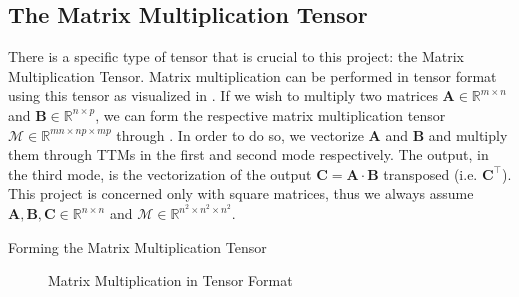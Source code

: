 \subsection{The Matrix Multiplication Tensor} \label{sec:The Matrix Multiplication Tensor}

    There is a specific type of tensor that is crucial to this project: the
    Matrix Multiplication Tensor. Matrix multiplication can be performed in
    tensor format using this tensor as visualized in .
    If we wish to multiply two matrices $\mathbf{A} \in \mathbb{R}^{m\times n}$
    and $\mathbf{B}\in \mathbb{R}^{n\times p}$, we can form the respective
    matrix multiplication tensor $\mathcal{M}\in \mathbb{R}^{mn \times np\times
    mp}$ through . In order to do so, we vectorize
    $\mathbf{A}$ and $\mathbf{B}$ and multiply them through TTMs in the first
    and second mode respectively. The output, in the third mode, is the
    vectorization of the output $\mathbf{C} = \mathbf{A}\cdot \mathbf{B}$
    transposed (i.e. $\mathbf{C^\intercal}$). This project is concerned only
    with square matrices, thus we always assume $\mathbf{A}, \mathbf{B},
    \mathbf{C}\in \mathbb{R}^{n\times n}$ and
    $\mathcal{M}\in\mathbb{R}^{n^2\times n^2\times n^2}$.

    \begin{algorithm}
        \caption{Forming the Matrix Multiplication Tensor}
        \label{alg:matmul_tensor}
        \begin{algorithmic}[0]
                 
                        \EndFor
                    \EndFor
                \EndFor
            \EndFunction
        \end{algorithmic}
    \end{algorithm}

    \begin{figure}
        \centering
        
        \caption{Matrix Multiplication in Tensor Format}
        \label{fig:matmul_tensor}
    \end{figure}


